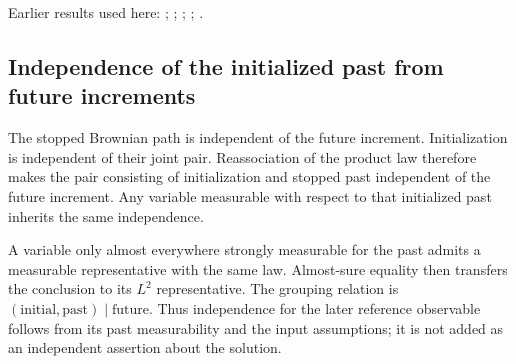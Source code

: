 \documentclass[11pt,a4paper]{report}
\begin{document}
Earlier results used here: \cite[Section~3.24.14]{LangevinLean2026ULASC}; \cite[Section~3.24.15]{LangevinLean2026ULASC}; \cite[Section~3.24.21]{LangevinLean2026ULASC}; \cite[Section~3.24.8]{LangevinLean2026ULASC}; \cite[Section~3.25.1]{LangevinLean2026ULASC}.
\subsection{\texorpdfstring{Independence of the initialized past from future increments}{Independence of the initialized past from future increments}}
\label{report-step-ProximalLangevin-SplittingOrthogonality-lean-3}


The stopped Brownian path is independent of the future increment. Initialization is independent of their joint pair. Reassociation of the product law therefore makes the pair consisting of initialization and stopped past independent of the future increment. Any variable measurable with respect to that initialized past inherits the same independence.



A variable only almost everywhere strongly measurable for the past admits a measurable representative with the same law. Almost-sure equality then transfers the conclusion to its \(L^2\) representative. The grouping relation is \((\text{initial},\text{past})\mid\text{future}\). Thus independence for the later reference observable follows from its past measurability and the input assumptions; it is not added as an independent assertion about the solution.
\end{document}
